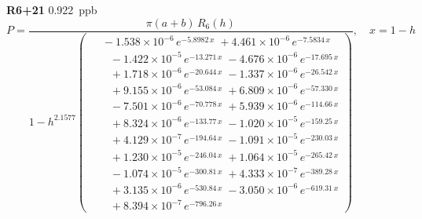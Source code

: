 \documentclass[12pt]{article}
\begin{document}
\noindent\textbf{R6+21} 0.922~ppb\nopagebreak
\begin{equation*}
P = \frac{\pi(a{+}b)\,R_6(h)}{1 - h^{2.1577}\!\left(\!\begin{aligned}
  &\; -1.538{\times}10^{-6}\,e^{-5.8982\,x} \; +4.461{\times}10^{-6}\,e^{-7.5834\,x} \\[-3pt]
  &\quad -1.422{\times}10^{-5}\,e^{-13.271\,x} \; -4.676{\times}10^{-6}\,e^{-17.695\,x} \\[-3pt]
  &\quad +1.718{\times}10^{-6}\,e^{-20.644\,x} \; -1.337{\times}10^{-6}\,e^{-26.542\,x} \\[-3pt]
  &\quad +9.155{\times}10^{-6}\,e^{-53.084\,x} \; +6.809{\times}10^{-6}\,e^{-57.330\,x} \\[-3pt]
  &\quad -7.501{\times}10^{-6}\,e^{-70.778\,x} \; +5.939{\times}10^{-6}\,e^{-114.66\,x} \\[-3pt]
  &\quad +8.324{\times}10^{-6}\,e^{-133.77\,x} \; -1.020{\times}10^{-5}\,e^{-159.25\,x} \\[-3pt]
  &\quad +4.129{\times}10^{-7}\,e^{-194.64\,x} \; -1.091{\times}10^{-5}\,e^{-230.03\,x} \\[-3pt]
  &\quad +1.230{\times}10^{-5}\,e^{-246.04\,x} \; +1.064{\times}10^{-5}\,e^{-265.42\,x} \\[-3pt]
  &\quad -1.074{\times}10^{-5}\,e^{-300.81\,x} \; +4.333{\times}10^{-7}\,e^{-389.28\,x} \\[-3pt]
  &\quad +3.135{\times}10^{-6}\,e^{-530.84\,x} \; -3.050{\times}10^{-6}\,e^{-619.31\,x} \\[-3pt]
  &\quad +8.394{\times}10^{-7}\,e^{-796.26\,x}
\end{aligned}\!\right)}, \quad x = 1{-}h
\end{equation*}
\end{document}
